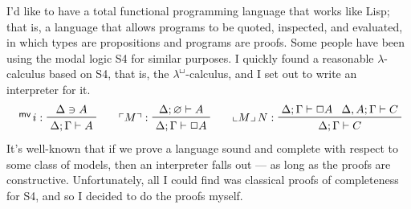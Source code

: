 \documentclass{entcs}
\newcommand{\lambdabox}{\lambda^{\mkern-1mu\sq\mkern-2mu}}
\renewcommand{\:}{\mathrel{:}}
\renewcommand{\;}{\mathbin{;}}
\newcommand{\tsf}[1]{\textsf{\upshape{#1}}}
\newcommand{\stsf}[1]{\tsf{\small{#1}}}
\newcommand{\tyrule}[1]{\prftree[l]{${#1} \:\,$}}
\newcommand{\sq}{\Box}
\renewcommand{\O}{\varnothing}
\renewcommand{\e}{\mathrel{\vdash}}
\newcommand{\mvar}{\operatorname{^{\stsf{mv}\mkern-1mu}}}
\newcommand{\quo}[1]{\mathopen{\ulcorner}{#1}\mathclose{\urcorner}}
\newcommand{\unquo}[1]{\mathopen{\llcorner}{#1}\mathclose{\lrcorner}\,}
\begin{document}
I'd like to have a total functional programming language that works like Lisp; that is, a language that allows programs to be quoted, inspected, and evaluated, in which types are propositions and programs are proofs.  Some people have been using the modal logic S4 for similar purposes.  I quickly found a reasonable $\lambda$-calculus based on S4, that is, the $\lambdabox$-calculus, and I set out to write an interpreter for it.
\begin{gather*}
  \tyrule{\mvar i}{\Delta \ni A}
                  {\Delta; \Gamma \e A}
  \qquad
  \tyrule{\quo{M}}{\Delta; \O \e A}
                  {\Delta; \Gamma \e \sq A}
  \qquad
  \tyrule{\unquo{M}{N}}{\Delta; \Gamma \e \sq A}{\Delta, A; \Gamma \e C}
                       {\Delta; \Gamma \e C}
\end{gather*}
It's well-known that if we prove a language sound and complete with respect to some class of models, then an interpreter falls out --- as long as the proofs are constructive.  Unfortunately, all I could find was classical proofs of completeness for S4, and so I decided to do the proofs myself.
\end{document}
